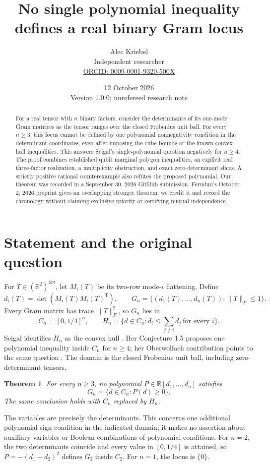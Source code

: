 \documentclass[11pt]{article}
\title{No single polynomial inequality defines a real binary Gram locus}
\author{Alec Kriebel\\
\small Independent researcher\\
\small \href{https://orcid.org/0009-0001-9320-500X}{ORCID: 0009-0001-9320-500X}}
\date{12 October 2026\\\small Version 1.0.0; unrefereed research note}
\newtheorem{theorem}{Theorem}
\newcommand{\R}{\mathbb R}
\begin{document}
\maketitle
\begin{abstract}
For a real tensor with \(n\) binary factors, consider the determinants of its one-mode Gram matrices as the tensor ranges over the closed Frobenius unit ball. For every \(n\geq3\), this locus cannot be defined by one polynomial nonnegativity condition in the determinant coordinates, even after imposing the cube bounds or the known convex-hull inequalities. This answers Seigal's single-polynomial question negatively for \(n\geq4\). The proof combines established qubit marginal polygon inequalities, an explicit real three-factor realization, a multiplicity obstruction, and exact zero-determinant slices. A strictly positive rational counterexample also refutes the proposed polynomial. Our theorem was recorded in a September 30, 2026 GitHub submission. Ferudun's October 2, 2026 preprint gives an overlapping stronger theorem; we credit it and record the chronology without claiming exclusive priority or certifying mutual independence.
\end{abstract}

\section{Statement and the original question}
For \(T\in(\R^2)^{\otimes n}\), let \(M_i(T)\) be its two-row mode-\(i\) flattening. Define
\[
 d_i(T)=\det(M_i(T)M_i(T)^{\mathsf T}),\qquad
 G_n=\{(d_1(T),\ldots,d_n(T)):\|T\|_F\leq1\}.
\]
Every Gram matrix has trace \(\|T\|_F^2\), so \(G_n\) lies in
\[
 C_n=[0,1/4]^n,\qquad
 H_n=\{d\in C_n:d_i\leq\textstyle\sum_{j\ne i}d_j\ \text{for every }i\}.
\]
Seigal identifies \(H_n\) as the convex hull \cite[Theorem 1.3]{Seigal}. Her Conjecture 1.5 proposes one polynomial inequality inside \(C_n\) for \(n\geq4\); her Oberwolfach contribution points to the same question \cite[p.~1226]{OWR}. The domain is the closed Frobenius unit ball, including zero-determinant tensors.

\begin{theorem}\label{thm:main}
For every \(n\geq3\), no polynomial \(P\in\R[d_1,\ldots,d_n]\) satisfies
\[
 G_n=\{d\in C_n:P(d)\geq0\}.
\]
The same conclusion holds with \(C_n\) replaced by \(H_n\).
\end{theorem}
The variables are precisely the determinants. This concerns one additional polynomial sign condition in the indicated domain; it makes no assertion about auxiliary variables or Boolean combinations of polynomial conditions. For \(n=2\), the two determinants coincide and every value in \([0,1/4]\) is attained, so \(P=-(d_1-d_2)^2\) defines \(G_2\) inside \(C_2\). For \(n=1\), the locus is \(\{0\}\).
\end{document}
